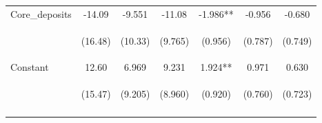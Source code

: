 \documentclass[]{article}
\begin{document}
\begin{center}
\begin{tabular}{lcccccc}
Core\_deposits & -14.09 & -9.551 & -11.08 & -1.986** & -0.956 & -0.680 \\
\vspace{4pt} & \begin{footnotesize}(16.48)\end{footnotesize} & \begin{footnotesize}(10.33)\end{footnotesize} & \begin{footnotesize}(9.765)\end{footnotesize} & \begin{footnotesize}(0.956)\end{footnotesize} & \begin{footnotesize}(0.787)\end{footnotesize} & \begin{footnotesize}(0.749)\end{footnotesize} \\
Constant & 12.60 & 6.969 & 9.231 & 1.924** & 0.971 & 0.630 \\
 & \begin{footnotesize}(15.47)\end{footnotesize} & \begin{footnotesize}(9.205)\end{footnotesize} & \begin{footnotesize}(8.960)\end{footnotesize} & \begin{footnotesize}(0.920)\end{footnotesize} & \begin{footnotesize}(0.760)\end{footnotesize} & \begin{footnotesize}(0.723)\end{footnotesize} \\
\vspace{4pt} & \begin{footnotesize}\end{footnotesize} & \begin{footnotesize}\end{footnotesize} & \begin{footnotesize}\end{footnotesize} & \begin{footnotesize}\end{footnotesize} & \begin{footnotesize}\end{footnotesize} & \begin{footnotesize}\end{footnotesize} \\

\end{tabular}
\end{center}
\end{document}
